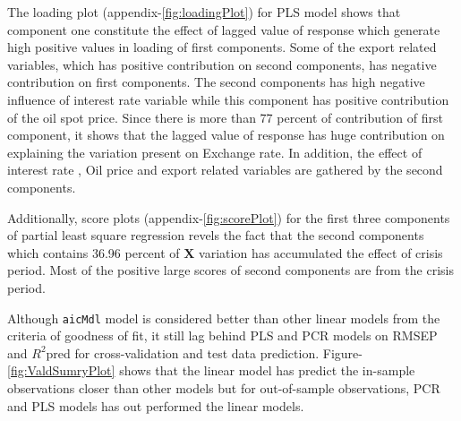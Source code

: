 \documentclass[12pt, lot, lof]{thesis}\usepackage[]{graphicx}\usepackage[]{color}
\newcommand{\mbf}[1]{\ensuremath{\mathbf{#1}}}
\begin{document}
The loading plot (appendix-\ref{fig:loadingPlot}) for PLS model shows that component one constitute the effect of lagged value of response which generate high positive values in loading of first components. Some of the export related variables, which has positive contribution on second components, has negative contribution on first components. The second components has high negative influence of interest rate variable while this component has positive contribution of the oil spot price. Since there is more than 77 percent of contribution of first component, it shows that the lagged value of response has huge contribution on explaining the variation present on Exchange rate. In addition, the effect of interest rate , Oil price and export related variables are gathered by the second components.

Additionally, score plots (appendix-\ref{fig:scorePlot}) for the first three components of partial least square regression revels the fact that the second components which contains 36.96 percent of \mbf{X} variation has accumulated the effect of crisis period. Most of the positive large scores of second components are from the crisis period.

Although \texttt{aicMdl} model is considered better than other linear models from the criteria of goodness of fit, it still lag behind PLS and PCR models on RMSEP and $R^2$pred for cross-validation and test data prediction. Figure-\ref{fig:ValdSumryPlot} shows that the linear model has predict the in-sample observations closer than other models but for out-of-sample observations, PCR and PLS models has out performed the linear models.
\end{document}
